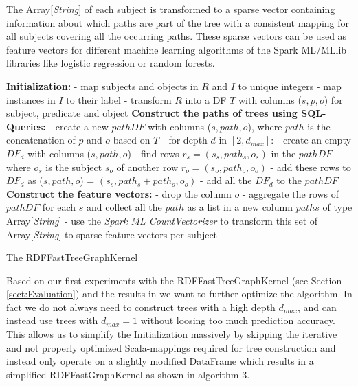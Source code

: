 \documentclass{easychair}
\begin{document}
The Array[\textit{String}] of each subject is transformed to a sparse vector containing information about which paths are part of the tree with a consistent mapping for all subjects covering all the occurring paths. These sparse vectors can be used as feature vectors for different machine learning algorithms of the Spark ML/MLlib libraries like logistic regression or random forests.
\begin{algorithm}
 \label{alg:FTGK}
 \;
 \textbf{Initialization:}\; \Indp
 - map subjects and objects in $R$ and $I$ to unique integers\;
 - map instances in $I$ to their label\;
 - transform $R$ into a DF $T$ with columns ($s,p,o$) for subject, predicate and object\; \Indm
\; 
\textbf{Construct the paths of trees using SQL-Queries:}\; \Indp
- create a new $pathDF$ with columns ($s,path,o$), where $path$ is the concatenation of $p$ and $o$ based on $T$\;
- for depth $d$ in $[2,d_{max}]$:\; \Indp
- create an empty $DF_d$ with columns ($s,path,o$)\;
- find rows $r_s = (s_s,path_s,o_s)$ in the $pathDF$ where $o_s$ is the subject $s_o$ of another row $r_o=(s_o,path_o,o_o)$\;
- add these rows to $DF_d$ as ($s,path,o$) = $(s_s,path_s+path_o,o_o)$\; \Indm
- add all the $DF_d$ to the $pathDF$\; \Indm
 \;
 \textbf{Construct the feature vectors:}\; \Indp
 - drop the column $o$\;
 - aggregate the rows of $pathDF$ for each $s$ and collect all the $path$ as a list in a new column $paths$ of type Array[\textit{String}]\;
 - use the \textit{Spark ML CountVectorizer} to transform this set of Array[\textit{String}] to sparse feature vectors per subject\;
\caption{The RDFFastTreeGraphKernel}
\end{algorithm}

Based on our first experiments with the RDFFastTreeGraphKernel (see Section \ref{sect:Evaluation}) and the results in \cite{FGK} we want to further optimize the algorithm. In fact we do not always need to construct trees with a high depth $d_{max}$, and can instead use trees with $d_{max}=1$ without loosing too much prediction accuracy. This allows us to simplify the Initialization massively by skipping the iterative and not properly optimized Scala-mappings required for tree construction and instead only operate on a slightly modified DataFrame which results in a simplified RDFFastGraphKernel as shown in algorithm 3.
\end{document}
